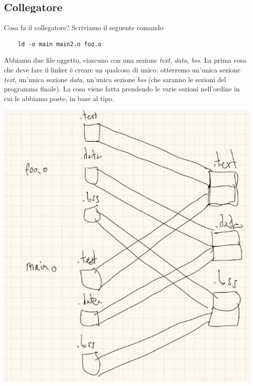 \subsection{Collegatore}
Cosa fa il collegatore? Scriviamo il seguente comando
\begin{verbatim}
	ld -o main main2.o foo.o
\end{verbatim}
Abbiamo due file oggetto, ciascuno con una sezione \emph{text}, \emph{data}, \emph{bss}. La prima cosa che deve fare il linker è creare un qualcosa di unico: otterremo un'unica sezione \emph{text}, un'unica sezione \emph{data}, un'unica sezione \emph{bss} (che saranno le sezioni del programma finale). La cosa viene fatta prendendo le varie sezioni nell'ordine in cui le abbiamo poste, in base al tipo.\begin{center}
	\includegraphics[scale=.85]{img/58.PNG}
\end{center}  
